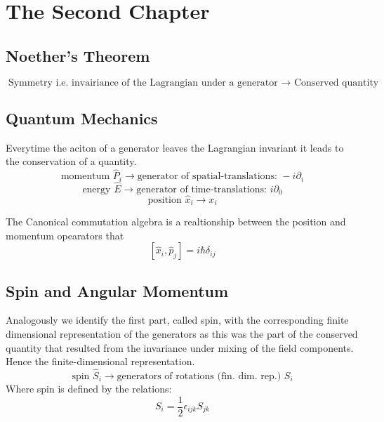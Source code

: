 \chapter{The Second Chapter}
\section{Noether's Theorem}
\begin{equation}
\text{Symmetry i.e. invairiance of the Lagrangian under a generator } \rightarrow \text{ Conserved quantity}
\end{equation}
\section{Quantum Mechanics}
Everytime the aciton of a generator leaves the Lagrangian invariant it leads to the conservation of a quantity. 
\begin{equation}
	\text{momentum } \hat{P}_{i} \rightarrow \text{generator of spatial-translations: } -i \partial_{i}
\end{equation}
\begin{equation}
\text{energy } \hat{E} \rightarrow \text{generator of time-translations: }  i \partial_{0}
\end{equation}
\begin{equation}
\text{position } \hat{x}_{i} \rightarrow x_{i}
\end{equation}

The Canonical commutation algebra is a realtionship between the position and momentum opearators that
\begin{equation}
	\left[\hat{x}_{i}, \hat{p}_{j}\right] = i \hbar \delta_{ij}
\end{equation}

\section{Spin and Angular Momentum}
Analogously we identify the first part, called spin, with the corresponding finite dimensional representation of the generators as this was the part of the conserved quantity that resulted from the invariance under mixing of the field components. Hence the finite-dimensional representation.
\begin{equation}
\text{spin } \hat{S}_{i} \rightarrow \text{generators of rotations (fin. dim. rep.) } S_{i}
\end{equation}
Where spin is defined by the relations:
\begin{equation}
	S_{i} = \frac{1}{2} \epsilon_{ijk} S_{jk}
\end{equation}

